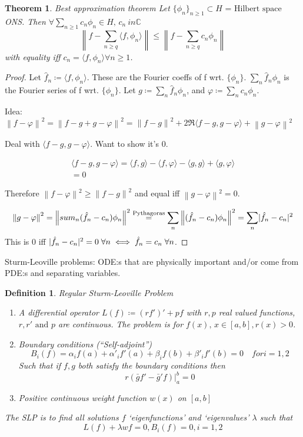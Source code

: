 \documentclass{article}
\newtheorem{theorem}{Theorem}
\newtheorem{definition}{Definition}
\DeclarePairedDelimiter\abs{\lvert}{\rvert}
\newcommand{\norm}[1]{\left\lVert#1\right\rVert}
\begin{document}
\begin{theorem}{Best approximation theorem}
	Let $\{\phi_n\}_{n \ge 1} \subset H \text{ = Hilbert space}$ ONS.
	Then $\forall \sum_{n \ge 1} c_n \phi_n \in H, \, c_n \ in \mathbb C$
	$$ \norm{f - \sum_{n \ge q} \langle f, \phi_n \rangle} \le \norm{f - \sum_{n \ge q} c_n \phi_n} $$
	with equality iff $c_n = \langle f, \phi_n \rangle \forall n \ge 1$.
\end{theorem}
\begin{proof}
	Let $\hat f_n \coloneqq \langle f, \phi_n \rangle$.
	These are the Fourier coeffs of f wrt. $\{\phi_n\}$.
	$\sum_n \hat f_n \phi_n$ is the Fourier series of f wrt. $\{\phi_n\}$.
	Let $g \coloneqq \sum_n \hat f_n \phi_n$, and $\varphi \coloneqq \sum_n c_n \phi_n$.

	Idea: $\norm{f - \varphi}^2 = \norm{f - g + g - \varphi}^2 = \norm{f - g}^2 + 2\Re \langle f - g, g - \varphi \rangle + \norm{g - \varphi}^2$

	Deal with $\langle f - g, g - \varphi \rangle$. Want to show it's 0.

	\begin{multline*}
		\langle f - g, g - \varphi \rangle = \langle f, g \rangle - \langle f, \varphi \rangle - \langle g, g \rangle + \langle g, \varphi \rangle \\
		= 0
	\end{multline*}

	Therefore $\norm{f - \varphi}^2 \ge \norm{f - g}^2$ and equal iff $\norm{g - \varphi}^2 = 0$.

	$$ \norm{g - \varphi}^2 = \norm{sum_n (\hat f_n - c_n) \phi_n}^2 \overset{\text{Pythagoras}}{=} \sum_n \norm{(\hat f_n - c_n) \phi_n}^2 = \sum_n \abs{\hat f_n - c_n}^2 $$
	This is 0 iff $\abs{\hat f_n - c_n}^2 = 0 \; \forall n \iff \hat f_n = c_n \; \forall n$.
\end{proof}

Sturm-Leoville problems: ODE:s that are physically important and/or come
from PDE:s and separating variables.

\begin{definition}{Regular Sturm-Leoville Problem}
	\begin{enumerate}
		\item A differential operator $L(f) \coloneqq (r f')' + pf$
			with $r, p$ real valued functions, $r, r' \text{ and } p$ are continuous.
			The problem is for $f(x), \, x \in [a, b], r(x) > 0$.
		\item Boundary conditions (``Self-adjoint'')
			$$ B_i(f) = \alpha_i f(a) + \alpha'_i f'(a) + \beta_i f(b) + \beta'_i f'(b) = 0 \quad for i = 1, 2 $$
			Such that if $f, g$ both satisfy the boundary conditions then
			$$ \left. r (\bar g f' - \bar g' f) \right\rvert_a^b = 0 $$
		\item Positive continuous weight function $w(x)$ on $[a, b]$
	\end{enumerate}

	The SLP is to find all solutions $f$ `eigenfunctions' and `eigenvalues' $\lambda$
	such that
	$$ L(f) + \lambda w f = 0, B_i(f) = 0, i = 1, 2 $$
\end{definition}
\end{document}
